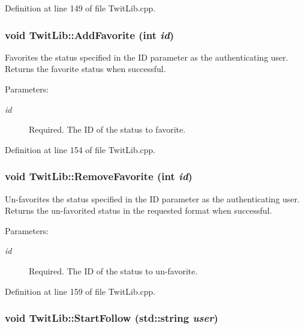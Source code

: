 Definition at line 149 of file TwitLib.cpp.\hypertarget{classTwitLib_d3caf78e988a99cdcc8ef8115afbc517}{
\subsubsection{\setlength{\rightskip}{0pt plus 5cm}void TwitLib::AddFavorite (int {\em id})}}
\label{classTwitLib_d3caf78e988a99cdcc8ef8115afbc517}


Favorites the status specified in the ID parameter as the authenticating user. Returns the favorite status when successful. \begin{Desc}
\item[Parameters:]
\begin{description}
\item[{\em id}]Required. The ID of the status to favorite. \end{description}
\end{Desc}


Definition at line 154 of file TwitLib.cpp.\hypertarget{classTwitLib_3cfdb83433fe9e5675bac209a6db01c6}{
\subsubsection{\setlength{\rightskip}{0pt plus 5cm}void TwitLib::RemoveFavorite (int {\em id})}}
\label{classTwitLib_3cfdb83433fe9e5675bac209a6db01c6}


Un-favorites the status specified in the ID parameter as the authenticating user. Returns the un-favorited status in the requested format when successful. \begin{Desc}
\item[Parameters:]
\begin{description}
\item[{\em id}]Required. The ID of the status to un-favorite. \end{description}
\end{Desc}


Definition at line 159 of file TwitLib.cpp.\hypertarget{classTwitLib_26c78a3d62971f17b9b61fbc413438ba}{
\subsubsection{\setlength{\rightskip}{0pt plus 5cm}void TwitLib::StartFollow (std::string {\em user})}}
\label{classTwitLib_26c78a3d62971f17b9b61fbc413438ba}


